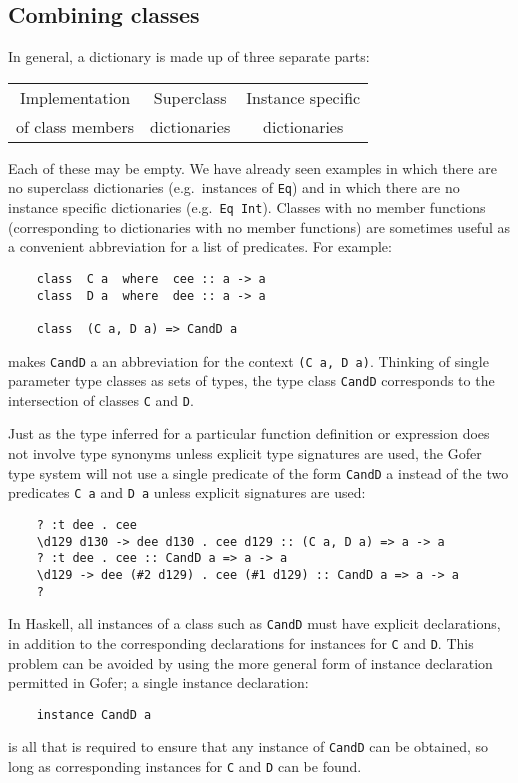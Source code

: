 \subsection{Combining classes}
In general, a dictionary is made up of three separate parts:
\BQ
\begin{tabular}{|c|c|c|}
\hline
Implementation   & Superclass   & Instance specific \\
of class members & dictionaries & dictionaries \\
\hline
\end{tabular}
\EQ
%
Each of these may be empty.  We have already  seen  examples  in  which
there are no superclass dictionaries (e.g.\ instances  of  \verb"Eq")  and  in
which there are no  instance  specific  dictionaries  (e.g.\  \verb"Eq Int").
Classes with no member functions (corresponding to dictionaries with no
member functions) are sometimes useful as a convenient abbreviation for
a list of predicates.  For example:
\begin{verbatim}
    class  C a  where  cee :: a -> a
    class  D a  where  dee :: a -> a

    class  (C a, D a) => CandD a
\end{verbatim}
makes \verb"CandD" a an abbreviation for the context \verb"(C a, D a)".  
Thinking  of
single parameter type classes as sets of types, the  type  class  \verb"CandD"
corresponds to the intersection of classes \verb"C" and \verb"D".

Just as the type inferred  for  a  particular  function  definition  or
expression does not involve type synonyms unless explicit type signatures
are used, the Gofer type system will not use a single predicate of  the
form \verb"CandD" a instead of the two predicates \verb"C a" 
and \verb"D a" unless  explicit
signatures are used:
\begin{verbatim}
    ? :t dee . cee
    \d129 d130 -> dee d130 . cee d129 :: (C a, D a) => a -> a
    ? :t dee . cee :: CandD a => a -> a
    \d129 -> dee (#2 d129) . cee (#1 d129) :: CandD a => a -> a
    ?
\end{verbatim}
In Haskell, all instances of  a  class  such  as  \verb"CandD"  must  have
explicit declarations, in addition to  the  corresponding  declarations
for instances for \verb"C" and \verb"D".  
This problem can be avoided  by  using  the
more general form of instance declaration permitted in Gofer; a  single
instance declaration:
\begin{verbatim}
    instance CandD a
\end{verbatim}
is all that is required to ensure that any instance  of  \verb"CandD"  can  be
obtained, so long as corresponding instances for \verb"C" and \verb"D" 
can be found.



